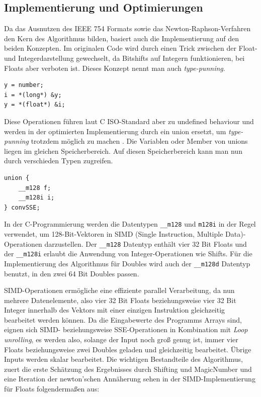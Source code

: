\documentclass[course=erap]{aspdoc}
\begin{document}
\subsection{Implementierung und Optimierungen}
Da das Ausnutzen des IEEE 754 Formats sowie das Newton-Raphson-Verfahren den Kern des Algorithmus bilden, basiert auch die Implementierung auf den beiden Konzepten. Im originalen Code wird durch einen Trick zwischen der Float- und Integerdarstellung gewechselt, da Bitshifts auf Integern funktionieren, bei Floats aber verboten ist. Dieses Konzept nennt man auch \emph{type-punning}.
\begin{lstlisting}
y = number;
i = *(long*) &y;
y = *(float*) &i;
\end{lstlisting}
Diese Operationen führen laut C ISO-Standard aber zu undefined behaviour und werden in der optimierten Implementierung durch ein union ersetzt, um \emph{type-punning} trotzdem möglich zu machen \cite{c17iso}. Die Variablen oder Member von unions liegen im gleichen Speicherbereich. Auf diesen Speicherbereich kann man nun durch verschieden Typen zugreifen.
\begin{lstlisting}
union {   
    __m128 f;
    __m128i i;
} convSSE;
\end{lstlisting}
In der C-Programmierung werden die Datentypen \lstinline{__m128} und \lstinline{m128i} in der Regel verwendet, um 128-Bit-Vektoren in SIMD (Single Instruction, Multiple Data)-Operationen darzustellen. Der \lstinline{__m128} Datentyp enthält vier 32 Bit Floats und der \lstinline{__m128i} erlaubt die Anwendung von Integer-Operationen wie Shifts. Für die Implementierung des Algorithmus für Doubles wird auch der \lstinline{__m128d} Datentyp benutzt, in den zwei 64 Bit Doubles passen. \par SIMD-Operationen ermögliche eine effiziente parallel Verarbeitung, da nun mehrere Datenelemente, also vier 32 Bit Floats beziehungsweise vier 32 Bit Integer innerhalb des Vektors mit einer einzigen Instruktion gleichzeitig bearbeitet werden können. Da die Eingabewerte des Programms Arrays sind, eignen sich SIMD- beziehungsweise SSE-Operationen in Kombination mit \emph{Loop unrolling}, es werden also, solange der Input noch groß genug ist, immer vier Floats beziehungsweise zwei Doubles geladen und gleichzeitig bearbeitet. Übrige Inputs werden skalar bearbeitet. Die wichtigen Bestandteile des Algorithmus, zuert die erste Schätzung des Ergebnisses durch Shifting und MagicNumber und eine Iteration der newton'schen Annäherung sehen in der SIMD-Implementierung für Floats folgendermaßen aus:
\end{document}
